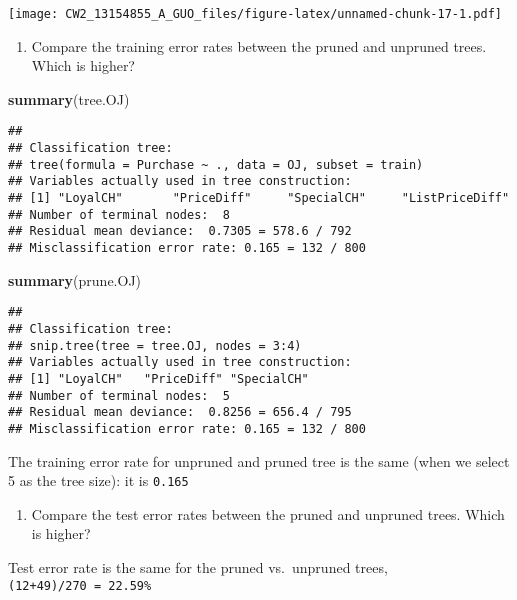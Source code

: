 \documentclass[]{article}
\newenvironment{Shaded}{\begin{snugshade}}{\end{snugshade}}
\newcommand{\KeywordTok}[1]{\textcolor[rgb]{0.13,0.29,0.53}{\textbf{#1}}}
\newcommand{\NormalTok}[1]{#1}
\providecommand{\tightlist}{%
  \setlength{\itemsep}{0pt}\setlength{\parskip}{0pt}}
\begin{document}
\texttt{[image: CW2\_13154855\_A\_GUO\_files/figure-latex/unnamed-chunk-17-1.pdf]}

\begin{enumerate}
\def\labelenumi{(\alph{enumi})}
\setcounter{enumi}{9}
\tightlist
\item
  Compare the training error rates between the pruned and unpruned
  trees. Which is higher?
\end{enumerate}

\begin{Shaded}
\begin{Highlighting}[]
\KeywordTok{summary}\NormalTok{(tree.OJ)}
\end{Highlighting}
\end{Shaded}

\begin{verbatim}
## 
## Classification tree:
## tree(formula = Purchase ~ ., data = OJ, subset = train)
## Variables actually used in tree construction:
## [1] "LoyalCH"       "PriceDiff"     "SpecialCH"     "ListPriceDiff"
## Number of terminal nodes:  8 
## Residual mean deviance:  0.7305 = 578.6 / 792 
## Misclassification error rate: 0.165 = 132 / 800
\end{verbatim}

\begin{Shaded}
\begin{Highlighting}[]
\KeywordTok{summary}\NormalTok{(prune.OJ)}
\end{Highlighting}
\end{Shaded}

\begin{verbatim}
## 
## Classification tree:
## snip.tree(tree = tree.OJ, nodes = 3:4)
## Variables actually used in tree construction:
## [1] "LoyalCH"   "PriceDiff" "SpecialCH"
## Number of terminal nodes:  5 
## Residual mean deviance:  0.8256 = 656.4 / 795 
## Misclassification error rate: 0.165 = 132 / 800
\end{verbatim}

The training error rate for unpruned and pruned tree is the same (when
we select 5 as the tree size): it is \texttt{0.165}

\begin{enumerate}
\def\labelenumi{(\alph{enumi})}
\setcounter{enumi}{10}
\tightlist
\item
  Compare the test error rates between the pruned and unpruned trees.
  Which is higher?
\end{enumerate}

Test error rate is the same for the pruned vs.~unpruned trees,
\texttt{(12+49)/270\ =\ 22.59\%}
\end{document}
